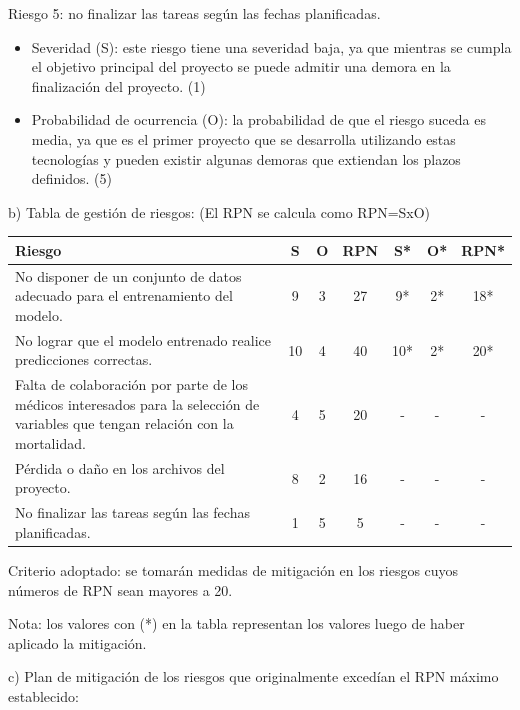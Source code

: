 \documentclass[
11pt, %
]{charter}
\begin{document}
Riesgo 5: no finalizar las tareas según las fechas planificadas.
\begin{itemize}
	\item Severidad (S): este riesgo tiene una severidad baja, ya que mientras se cumpla el objetivo principal del proyecto se puede admitir una demora en la finalización del proyecto. (1)
	\item Probabilidad de ocurrencia (O): la probabilidad de que el riesgo suceda es media, ya que es el primer proyecto que se desarrolla utilizando estas tecnologías y pueden existir algunas demoras que extiendan los plazos definidos. (5)
\end{itemize}

b) Tabla de gestión de riesgos:      (El RPN se calcula como RPN=SxO)

\begin{table}[htpb]
\centering
\begin{tabularx}{\linewidth}{@{}|X|c|c|c|c|c|c|@{}}
\hline
\rowcolor[HTML]{C0C0C0} 
Riesgo & S & O & RPN & S* & O* & RPN* \\ \hline
No disponer de un conjunto de datos adecuado para el entrenamiento del modelo. & 9 & 3 & 27 & 9* & 2* & 18* \\ \hline
No lograr que el modelo entrenado realice predicciones correctas. & 10 & 4 & 40 & 10* & 2* & 20* \\ \hline
Falta de colaboración por parte de los médicos interesados para la selección de variables que tengan relación con la mortalidad.        & 4 & 5 & 20 & - & - & - \\ \hline
Pérdida o daño en los archivos del proyecto. & 8 & 2 & 16 & - & - & - \\ \hline
No finalizar las tareas según las fechas planificadas. & 1  & 5 & 5 & - & - & - \\ \hline
\end{tabularx}%
\end{table}

Criterio adoptado: se tomarán medidas de mitigación en los riesgos cuyos números de RPN sean mayores a 20.

Nota: los valores con (*) en la tabla representan los valores luego de haber aplicado la mitigación.

c) Plan de mitigación de los riesgos que originalmente excedían el RPN máximo establecido:
\end{document}
